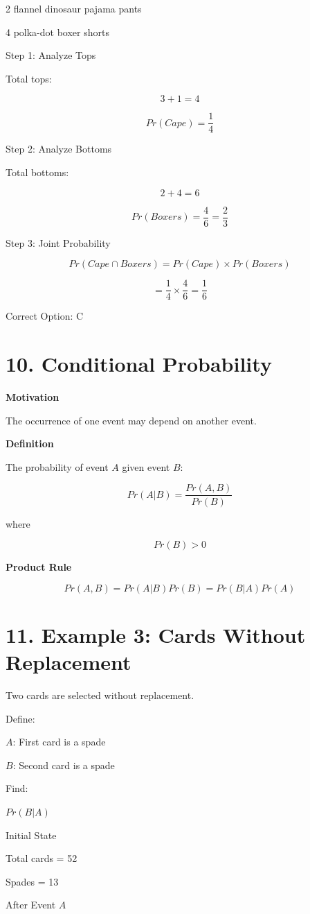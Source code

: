 \documentclass[12pt]{article}
\begin{document}
2 flannel dinosaur pajama pants

4 polka-dot boxer shorts

Step 1: Analyze Tops

Total tops:

\[
3+1=4
\]

\[
Pr(Cape)=\frac{1}{4}
\]

Step 2: Analyze Bottoms

Total bottoms:

\[
2+4=6
\]

\[
Pr(Boxers)=\frac{4}{6}=\frac{2}{3}
\]

Step 3: Joint Probability

\[
Pr(Cape \cap Boxers)=Pr(Cape)\times Pr(Boxers)
\]

\[
=\frac{1}{4}\times\frac{4}{6}=\frac{1}{6}
\]

Correct Option: C

\section*{10. Conditional Probability}

\textbf{Motivation}

The occurrence of one event may depend on another event.

\textbf{Definition}

The probability of event $A$ given event $B$:

\[
Pr(A|B)=\frac{Pr(A,B)}{Pr(B)}
\]

where

\[
Pr(B)>0
\]

\textbf{Product Rule}

\[
Pr(A,B)=Pr(A|B)Pr(B)=Pr(B|A)Pr(A)
\]

\section*{11. Example 3: Cards Without Replacement}

Two cards are selected without replacement.

Define:

$A$: First card is a spade

$B$: Second card is a spade

Find:

$Pr(B|A)$

Initial State

Total cards = 52

Spades = 13

After Event $A$
\end{document}
